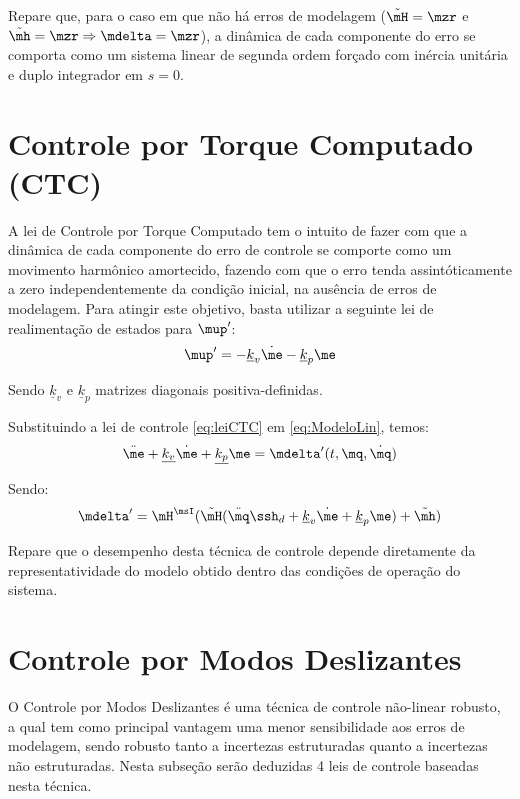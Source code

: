 \documentclass[]{politex}
\begin{document}
Repare que, para o caso em que não há erros de modelagem ($\tilde{\mH} = \mzr$ e $\tilde{\mh} = \mzr \Rightarrow \mdelta = \mzr$), a dinâmica de cada componente do erro se comporta como um sistema linear de segunda ordem forçado com inércia unitária e duplo integrador em $s = 0$.

\section{Controle por Torque Computado (CTC)}

A lei de Controle por Torque Computado tem o intuito de fazer com que a dinâmica de cada componente do erro de controle se comporte como um movimento harmônico amortecido, fazendo com que o erro tenda assintóticamente a zero independentemente da condição inicial, na ausência de erros de modelagem. Para atingir este objetivo, basta utilizar a seguinte lei de realimentação de estados para $\mup'$:
\begin{equation} \label{eq:leiCTC}
\mup' = -\underline{k}_v \dot{\me} - \underline{k}_p \me
\end{equation}

Sendo $\underline{k}_v$ e $\underline{k}_p$ matrizes diagonais positiva-definidas.

Substituindo a lei de controle \eqref{eq:leiCTC} em \eqref{eq:ModeloLin}, temos:
\begin{equation}
\ddot{\me} + \underline{k_v} \dot{\me} + \underline{k_p} \me = \mdelta'(t,\mq,\dot{\mq})
\end{equation}

Sendo:
\begin{equation}
\mdelta' = \mH^\msI( \tilde{\mH}(\ddot{\mq}\ssh_d + \underline{k}_v \dot{\me} + \underline{k}_p \me ) + \tilde{\mh} )
\end{equation}

Repare que o desempenho desta técnica de controle depende diretamente da representatividade do modelo obtido dentro das condições de operação do sistema. 


\section{Controle por Modos Deslizantes}

O Controle por Modos Deslizantes é uma técnica de controle não-linear robusto, a qual tem como principal vantagem uma menor sensibilidade aos erros de modelagem, sendo robusto tanto a incertezas estruturadas quanto a incertezas não estruturadas. Nesta subseção serão deduzidas 4 leis de controle baseadas nesta técnica.
\end{document}
